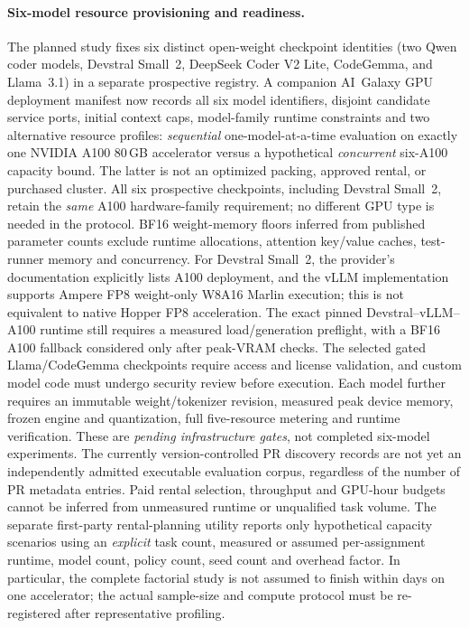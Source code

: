 \documentclass[pdflatex,sn-basic]{sn-jnl}
\begin{document}
\paragraph{Six-model resource provisioning and readiness.}
The planned study fixes six distinct open-weight checkpoint
identities (two Qwen coder models, Devstral Small~2,
DeepSeek Coder V2 Lite, CodeGemma, and Llama~3.1)
in a separate prospective registry. A companion
AI~Galaxy GPU deployment manifest now records
all six model identifiers, disjoint candidate service ports,
initial context caps, model-family runtime constraints
and two alternative resource profiles:
\emph{sequential} one-model-at-a-time evaluation on
exactly one NVIDIA A100 80\,GB accelerator versus a
hypothetical \emph{concurrent} six-A100 capacity bound.
The latter is not an optimized packing, approved
rental, or purchased cluster. All six prospective
checkpoints, including Devstral Small~2, retain the
\emph{same} A100 hardware-family requirement; no
different GPU type is needed in the protocol.
BF16 weight-memory floors inferred from published
parameter counts exclude runtime allocations, attention
key/value caches, test-runner memory and concurrency.
For Devstral Small~2, the provider's documentation
explicitly lists A100 deployment, and the vLLM
implementation supports Ampere FP8 weight-only W8A16
Marlin execution; this is not equivalent to native
Hopper FP8 acceleration. The exact pinned
Devstral--vLLM--A100 runtime still requires a
measured load/generation preflight, with a BF16
A100 fallback considered only after peak-VRAM checks.
The selected gated Llama/CodeGemma
checkpoints require access and license validation, and
custom model code must undergo security review before
execution. Each model further requires an immutable
weight/tokenizer revision, measured peak device memory,
frozen engine and quantization, full five-resource metering
and runtime verification. These are \emph{pending
infrastructure gates}, not completed six-model experiments.
The currently version-controlled PR discovery records
are not yet an independently admitted executable
evaluation corpus, regardless of the number of PR
metadata entries. Paid rental selection, throughput
and GPU-hour budgets cannot be inferred from unmeasured
runtime or unqualified task volume. The separate
first-party rental-planning utility reports only
hypothetical capacity scenarios using an \emph{explicit}
task count, measured or assumed per-assignment runtime,
model count, policy count, seed count and overhead factor.
In particular, the complete factorial study is not
assumed to finish within days on one accelerator;
the actual sample-size and compute protocol must
be re-registered after representative profiling.
\end{document}
